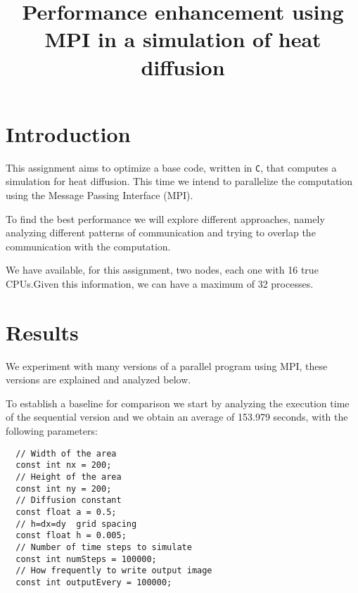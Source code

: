 \documentclass[conference]{IEEEtran}
\begin{document}
\title{Performance enhancement using MPI in a simulation of heat diffusion}

\author{
  \and
}

\maketitle



\section{Introduction}
This assignment aims to optimize a base code, written in \texttt{C}, that computes a simulation for heat diffusion. This time we intend to parallelize the computation using the Message Passing Interface (MPI).

To find the best performance we will explore different approaches, namely analyzing different patterns of communication and trying to overlap the communication with the computation.

We have available, for this assignment, two nodes, each one with 16 true CPUs.\@ Given this information, we can have a maximum of 32 processes.


\section{Results}
We experiment with many versions of a parallel program using MPI, these versions are explained and analyzed below.

To establish a baseline for comparison we start by analyzing the execution time of the sequential version and we obtain an average of 153.979 seconds, with the following parameters:
\begin{verbatim}
  // Width of the area
  const int nx = 200;
  // Height of the area
  const int ny = 200;
  // Diffusion constant           
  const float a = 0.5;
  // h=dx=dy  grid spacing
  const float h = 0.005;
  // Number of time steps to simulate
  const int numSteps = 100000;  
  // How frequently to write output image
  const int outputEvery = 100000;
\end{verbatim}
\end{document}
